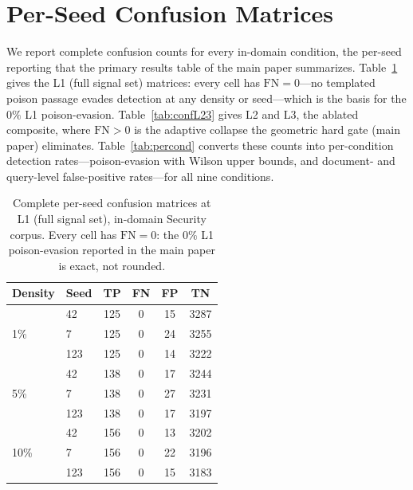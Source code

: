 \documentclass[10pt,journal,compsoc]{IEEEtran}
\begin{document}
\appendices


\section{Per-Seed Confusion Matrices}
\label{app:confusion}
We report complete confusion counts for every in-domain condition, the per-seed
reporting that the primary results table of the main paper summarizes. Table~\ref{tab:confL1}
gives the L1 (full signal set) matrices: every cell has $\mathrm{FN}=0$---no
templated poison passage evades detection at any density or seed---which is the
basis for the $0\%$ L1 poison-evasion. Table~\ref{tab:confL23} gives L2 and L3, the
ablated composite, where $\mathrm{FN}>0$ is the adaptive collapse the geometric hard
gate (main paper) eliminates. Table~\ref{tab:percond} converts these
counts into per-condition detection rates---poison-evasion with Wilson upper bounds,
and document- and query-level false-positive rates---for all nine conditions.

\begin{table}[t]
\centering
\caption{Complete per-seed confusion matrices at L1 (full signal set), in-domain
Security corpus. Every cell has $\mathrm{FN}=0$: the $0\%$ L1 poison-evasion reported
in the main paper is exact, not rounded.}
\label{tab:confL1}
\begin{tabular}{llcccc}
\toprule
Density & Seed & TP & FN & FP & TN \\
\midrule
\multirow{3}{*}{1\%}  & 42  & 125 & 0 & 15 & 3287 \\
                      & 7   & 125 & 0 & 24 & 3255 \\
                      & 123 & 125 & 0 & 14 & 3222 \\
\midrule
\multirow{3}{*}{5\%}  & 42  & 138 & 0 & 17 & 3244 \\
                      & 7   & 138 & 0 & 27 & 3231 \\
                      & 123 & 138 & 0 & 17 & 3197 \\
\midrule
\multirow{3}{*}{10\%} & 42  & 156 & 0 & 13 & 3202 \\
                      & 7   & 156 & 0 & 22 & 3196 \\
                      & 123 & 156 & 0 & 15 & 3183 \\
\bottomrule
\end{tabular}
\end{table}
\end{document}
